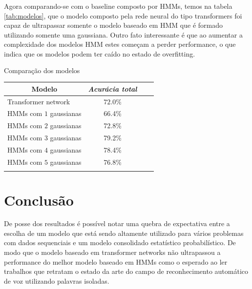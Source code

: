 \documentclass[
	12pt,				%
	openright,			%
	oneside,			%
	a4paper,			%
	chapter=TITLE,		%
	english,			%
	french,				%
	spanish,			%
	brazil				%
	]{abntex2}
\theoremstyle{definition}
\begin{document}
\newpage
Agora comparando-se com o baseline composto por HMMs, temos na tabela \ref{tab:modelos}, que o modelo composto pela rede neural do tipo transformers foi capaz de ultrapassar somente o modelo baseado em HMM que é formado utilizando somente uma gaussiana. Outro fato interessante é que ao aumentar a complexidade dos modelos HMM estes começam a perder performance, o que indica que os modelos podem ter caído no estado de overfitting.
\begin{quadro}[!h]
	\centering
	\caption{Comparação dos modelos}
	\label{tab:modelos}
	\begin{tabular}{lccc}
		\toprule
		\multicolumn{1}{c}{\textbf{Modelo}} & \textbf{\textit{Acurácia total}} \\ \midrule

		Transformer network                 & $72.0\%$                         \\

		HMMs  com $1$ gaussianas            & 66.4\%                           \\

		HMMs  com $2$ gaussianas            & 72.8\%                           \\

		HMMs  com $3$ gaussianas            & 79.2\%                           \\
		HMMs  com $4$ gaussianas            & 78.4\%                           \\

		HMMs  com $5$ gaussianas            & 76.8\%                           \\
		\bottomrule                                                            \\
	\end{tabular}
\end{quadro}




\chapter{Conclusão}
\label{conclusao}

De posse dos resultados é possível notar uma quebra de expectativa entre a escolha de um modelo que está sendo altamente utilizado para vários problemas com dados sequenciais e um modelo consolidado estatístico probabilístico. De modo que o modelo baseado em transformer networks não ultrapassou a performance do melhor modelo baseado em HMMs como o esperado ao ler trabalhos que retratam o estado da arte do campo de reconhecimento automático de voz utilizando palavras isoladas.
\end{document}
